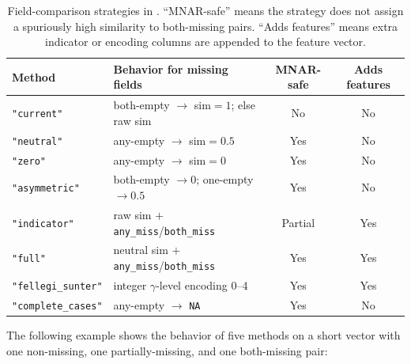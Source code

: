 \documentclass[a4paper]{article}
\begin{document}
\begin{article}
\begin{table}[ht]
\centering
\caption{Field-comparison strategies in . ``MNAR-safe''
  means the strategy does not assign a spuriously high similarity to
  both-missing pairs. ``Adds features'' means extra indicator or
  encoding columns are appended to the feature vector.}
\label{tab:strategies}
\smallskip
\begin{tabular}{lp{4.8cm}cc}
\toprule
\textbf{Method} & \textbf{Behavior for missing fields}
  & \textbf{MNAR-safe} & \textbf{Adds features} \\
\midrule
\texttt{"current"}       & both-empty $\to$ sim$=1$; else raw sim  & No  & No \\
\texttt{"neutral"}       & any-empty $\to$ sim$=0.5$               & Yes & No \\
\texttt{"zero"}          & any-empty $\to$ sim$=0$                 & Yes & No \\
\texttt{"asymmetric"}    & both-empty $\to 0$; one-empty $\to 0.5$ & Yes & No \\
\texttt{"indicator"}     & raw sim $+$ \texttt{any\_miss}/\texttt{both\_miss} & Partial & Yes \\
\texttt{"full"}          & neutral sim $+$ \texttt{any\_miss}/\texttt{both\_miss} & Yes & Yes \\
\texttt{"fellegi\_sunter"} & integer $\gamma$-level encoding 0--4  & Yes & Yes \\
\texttt{"complete\_cases"} & any-empty $\to$ \texttt{NA}           & Yes & No \\
\bottomrule
\end{tabular}
\end{table}

The following example shows the behavior of five methods on a short
vector with one non-missing, one partially-missing, and one
both-missing pair:

\end{article}
\end{document}
